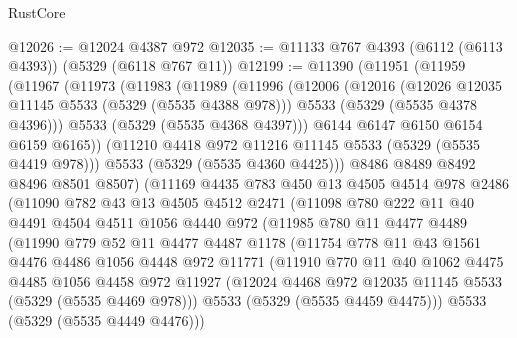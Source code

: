 \begin{lexlean}{RustCore}
\begin{coremodule}
@12026 := @12024 @4387 @972
@12035 := @11133 @767 @4393 (@6112 (@6113 @4393)) (@5329 (@6118 @767 @11))
@12199 := @11390
    (@11951
      (@11959
        (@11967
          (@11973
            (@11983
              (@11989
                (@11996
                  (@12006
                    (@12016
                      (@12026 @12035 @11145 @5533 (@5329 (@5535 @4388 @978)))
                      @5533
                      (@5329 (@5535 @4378 @4396)))
                    @5533
                    (@5329 (@5535 @4368 @4397)))
                  @6144
                  @6147
                  @6150
                  @6154
                  @6159
                  @6165))
              (@11210 @4418 @972 @11216 @11145 @5533 (@5329 (@5535 @4419 @978)))
              @5533
              (@5329 (@5535 @4360 @4425)))
            @8486
            @8489
            @8492
            @8496
            @8501
            @8507)
          (@11169
            @4435
            @783
            @450
            @13
            @4505
            @4514
            @978
            @2486
            (@11090
              @782
              @43
              @13
              @4505
              @4512
              @2471
              (@11098
                @780
                @222
                @11
                @40
                @4491
                @4504
                @4511
                @1056
                @4440
                @972
                (@11985
                  @780
                  @11
                  @4477
                  @4489
                  (@11990
                    @779
                    @52
                    @11
                    @4477
                    @4487
                    @1178
                    (@11754
                      @778
                      @11
                      @43
                      @1561
                      @4476
                      @4486
                      @1056
                      @4448
                      @972
                      @11771
                      (@11910
                        @770
                        @11
                        @40
                        @1062
                        @4475
                        @4485
                        @1056
                        @4458
                        @972
                        @11927
                        (@12024 @4468 @972 @12035 @11145 @5533 (@5329 (@5535 @4469 @978)))
                        @5533
                        (@5329 (@5535 @4459 @4475)))
                      @5533
                      (@5329 (@5535 @4449 @4476)))

\end{coremodule}
\end{lexlean}
